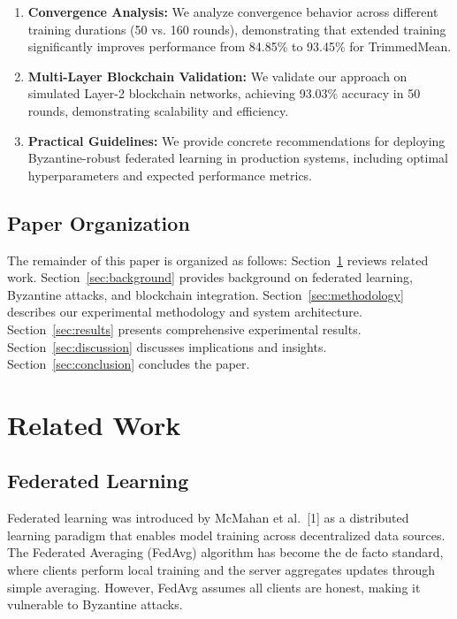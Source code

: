 \documentclass[12pt,a4paper,onecolumn]{article}
\begin{document}
\begin{enumerate}
    \item \textbf{Convergence Analysis:} We analyze convergence behavior across different training durations (50 vs. 160 rounds), demonstrating that extended training significantly improves performance from 84.85\% to 93.45\% for TrimmedMean.
    
    \item \textbf{Multi-Layer Blockchain Validation:} We validate our approach on simulated Layer-2 blockchain networks, achieving 93.03\% accuracy in 50 rounds, demonstrating scalability and efficiency.
    
    \item \textbf{Practical Guidelines:} We provide concrete recommendations for deploying Byzantine-robust federated learning in production systems, including optimal hyperparameters and expected performance metrics.
\end{enumerate}

\subsection{Paper Organization}

The remainder of this paper is organized as follows: Section~\ref{sec:related} reviews related work. Section~\ref{sec:background} provides background on federated learning, Byzantine attacks, and blockchain integration. Section~\ref{sec:methodology} describes our experimental methodology and system architecture. Section~\ref{sec:results} presents comprehensive experimental results. Section~\ref{sec:discussion} discusses implications and insights. Section~\ref{sec:conclusion} concludes the paper.

\section{Related Work}
\label{sec:related}

\subsection{Federated Learning}

Federated learning was introduced by McMahan et al.~[1] as a distributed learning paradigm that enables model training across decentralized data sources. The Federated Averaging (FedAvg) algorithm has become the de facto standard, where clients perform local training and the server aggregates updates through simple averaging. However, FedAvg assumes all clients are honest, making it vulnerable to Byzantine attacks.
\end{document}
